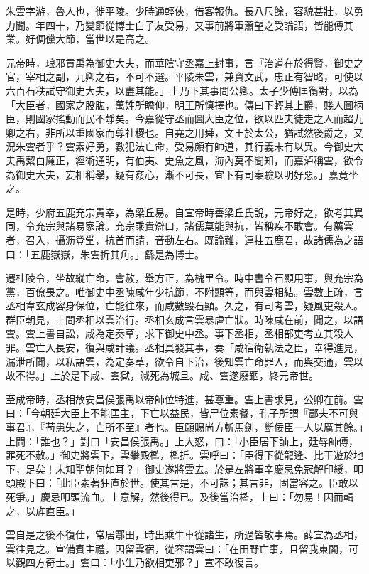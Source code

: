 \begin{pinyinscope}
朱雲字游，魯人也，徙平陵。少時通輕俠，借客報仇。長八尺餘，容貌甚壯，以勇力聞。年四十，乃變節從博士白子友受易，又事前將軍蕭望之受論語，皆能傳其業。好倜儻大節，當世以是高之。

元帝時，琅邪貢禹為御史大夫，而華陰守丞嘉上封事，言『治道在於得賢，御史之官，宰相之副，九卿之右，不可不選。平陵朱雲，兼資文武，忠正有智略，可使以六百石秩試守御史大夫，以盡其能。」上乃下其事問公卿。太子少傅匡衡對，以為「大臣者，國家之股肱，萬姓所瞻仰，明王所慎擇也。傳曰下輕其上爵，賤人圖柄臣，則國家搖動而民不靜矣。今嘉從守丞而圖大臣之位，欲以匹夫徒走之人而超九卿之右，非所以重國家而尊社稷也。自堯之用舜，文王於太公，猶試然後爵之，又況朱雲者乎？雲素好勇，數犯法亡命，受易頗有師道，其行義未有以異。今御史大夫禹絜白廉正，經術通明，有伯夷、史魚之風，海內莫不聞知，而嘉泸稱雲，欲令為御史大夫，妄相稱舉，疑有姦心，漸不可長，宜下有司案驗以明好惡。」嘉竟坐之。

是時，少府五鹿充宗貴幸，為梁丘易。自宣帝時善梁丘氏說，元帝好之，欲考其異同，令充宗與諸易家論。充宗乘貴辯口，諸儒莫能與抗，皆稱疾不敢會。有薦雲者，召入，攝沥登堂，抗首而請，音動左右。既論難，連拄五鹿君，故諸儒為之語曰：「五鹿嶽嶽，朱雲折其角。」繇是為博士。

遷杜陵令，坐故縱亡命，會赦，舉方正，為槐里令。時中書令石顯用事，與充宗為黨，百僚畏之。唯御史中丞陳咸年少抗節，不附顯等，而與雲相結。雲數上疏，言丞相韋玄成容身保位，亡能往來，而咸數毀石顯。久之，有司考雲，疑風吏殺人。群臣朝見，上問丞相以雲治行。丞相玄成言雲暴虐亡狀。時陳咸在前，聞之，以語雲。雲上書自訟，咸為定奏草，求下御史中丞。事下丞相，丞相部吏考立其殺人罪。雲亡入長安，復與咸計議。丞相具發其事，奏「咸宿衛執法之臣，幸得進見，漏泄所聞，以私語雲，為定奏草，欲令自下治，後知雲亡命罪人，而與交通，雲以故不得。」上於是下咸、雲獄，減死為城旦。咸、雲遂廢錮，終元帝世。

至成帝時，丞相故安昌侯張禹以帝師位特進，甚尊重。雲上書求見，公卿在前。雲曰：「今朝廷大臣上不能匡主，下亡以益民，皆尸位素餐，孔子所謂『鄙夫不可與事君』，『苟患失之，亡所不至』者也。臣願賜尚方斬馬劍，斷佞臣一人以厲其餘。」上問：「誰也？」對曰「安昌侯張禹。」上大怒，曰：「小臣居下訕上，廷辱師傅，罪死不赦。」御史將雲下，雲攀殿檻，檻折。雲呼曰：「臣得下從龍逄、比干遊於地下，足矣！未知聖朝何如耳？」御史遂將雲去。於是左將軍辛慶忌免冠解印綬，叩頭殿下曰：「此臣素著狂直於世。使其言是，不可誅；其言非，固當容之。臣敢以死爭。」慶忌叩頭流血。上意解，然後得已。及後當治檻，上曰：「勿易！因而輯之，以旌直臣。」

雲自是之後不復仕，常居鄠田，時出乘牛車從諸生，所過皆敬事焉。薛宣為丞相，雲往見之。宣備賓主禮，因留雲宿，從容謂雲曰：「在田野亡事，且留我東閤，可以觀四方奇士。」雲曰：「小生乃欲相吏邪？」宣不敢復言。


\end{pinyinscope}
